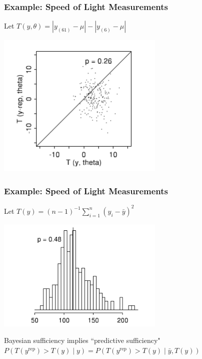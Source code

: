 \documentclass{beamer}
\begin{document}
\begin{frame}
\frametitle{Example: Speed of Light Measurements}

Let $T(y,\theta) = |y_{(61)} - \mu| - |y_{(6)} - \mu|$

\begin{center}
\includegraphics[width=80mm]{T_scatter.png}
\end{center}

\end{frame}

\begin{frame}
\frametitle{Example: Speed of Light Measurements}

Let $T(y) = (n-1)^{-1}\sum_{i=1}^n (y_i-\bar{y})^2$

\begin{center}
\includegraphics[width=80mm]{s2_hist.png}
\end{center}

Bayesian sufficiency implies ``predictive sufficiency" \\
$P(T(y^{\text{rep} } ) > T(y ) \mid y) = P(T(y^{\text{rep} } ) > T(y) \mid \bar{y}, T(y))$


\end{frame}
\end{document}
